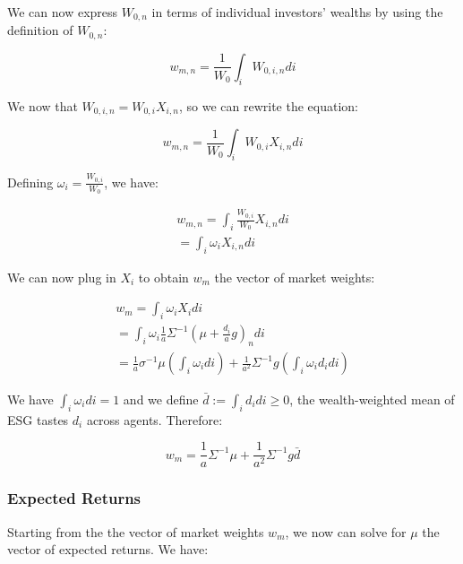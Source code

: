 We can now express $W_{0,n}$ in terms of individual investors' wealths
by using the definition of $W_{0,n}$:

\begin{equation}
    w_{m,n} = \frac{1}{W_0} \int_i W_{0,i,n} di
\end{equation}

We now that $W_{0,i,n} = W_{0,i} X_{i,n}$, so we can rewrite the equation:

\begin{equation}
    w_{m,n} = \frac{1}{W_0} \int_i W_{0,i} X_{i,n} di
\end{equation}

Defining $\omega_i = \frac{W_{0,i}}{W_0}$, we have:

\begin{equation}
    \begin{aligned}
    w_{m,n} = \int_i \frac{W_{0,i}}{W_0} X_{i,n} di\\
    = \int_i \omega_i X_{i,n} di
    \end{aligned}
\end{equation}

We can now plug in $X_i$ to obtain $w_m$ the vector 
of market weights: 

\begin{equation}
    \begin{aligned}
    w_{m} = \int_i \omega_i X_i di \\ 
     = \int_i \omega_i \frac{1}{a} \Sigma^{-1}(\mu + \frac{d_i}{a}g)_n di \\
     = \frac{1}{a} \sigma^{-1} \mu (\int_i \omega_i di) + \frac{1}{a^2} \Sigma^{-1} g (\int_i \omega_i d_i di)
    \end{aligned}
\end{equation}


We have $\int_i \omega_i di = 1$ and we define $\bar{d} := \int_i d_i di \geq 0$,
the wealth-weighted mean of ESG tastes $d_i$ across agents. Therefore:

\begin{equation}
    w_m = \frac{1}{a} \Sigma^{-1} \mu + \frac{1}{a^2} \Sigma^{-1} g \bar{d}
\end{equation}

\subsubsection{Expected Returns}

Starting from the the vector of market weights $w_m$, we now can 
solve for $\mu$ the vector of expected returns. We have:

